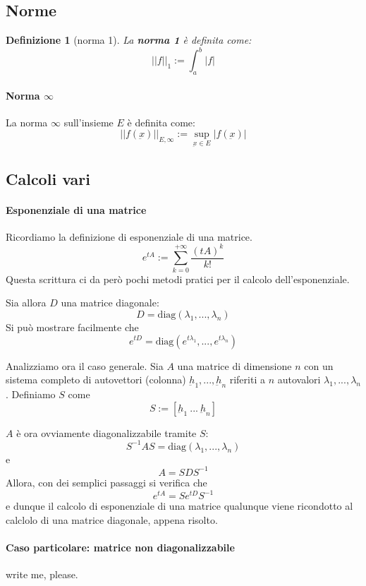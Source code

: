 \documentclass[a4paper,12pt]{article}
\newtheorem{defi}{Definizione}
\begin{document}
\subsection{Norme}
\begin{defi}[norma 1]
La \textbf{norma 1} è definita come:
$$||f||_1 := \int_a^b|f|$$
\end{defi}
\paragraph{Norma $\infty$}
La norma $\infty$ sull'insieme $E$ è definita come:
$$||f(\underbar{x})||_{E,\infty} := \sup_{\underbar{x}\in E} |f(\underbar{x})|$$


\subsection{Calcoli vari}
\paragraph{Esponenziale di una matrice}
Ricordiamo la definizione di esponenziale di una matrice.
$$e^{tA} := \sum_{k=0}^{+\infty} \dfrac{(tA)^k}{k!}$$
Questa scrittura ci da però pochi metodi pratici per il calcolo dell'esponenziale.

Sia allora $D$ una matrice diagonale:
$$D=\text{diag}(\lambda_1,...,\lambda_n)$$
Si può mostrare facilmente che
$$e^{tD} = \text{diag}(e^{t\lambda_1}, ..., e^{t\lambda_n})$$

Analizziamo ora il caso generale.
Sia $A$ una matrice di dimensione $n$ con un sistema completo di autovettori (colonna) $\underbar{h}_1, ..., \underbar{h}_n$ riferiti a $n$ autovalori $\lambda_1, ..., \lambda_n$. Definiamo $S$ come
$$S:=[\underbar{h}_1\ ...\ \underbar{h}_n]$$

$A$ è ora ovviamente diagonalizzabile tramite $S$:
$$S^{-1}AS=\text{diag}(\lambda_1,...,\lambda_n)$$
e
$$A = SDS^{-1}$$
Allora, con dei semplici passaggi si verifica che
$$e^{tA} = Se^{tD}S^{-1}$$
e dunque il calcolo di esponenziale di una matrice qualunque viene ricondotto al calclolo di una matrice diagonale, appena risolto.
\paragraph{Caso particolare: matrice non diagonalizzabile}
write me, please.
\end{document}
